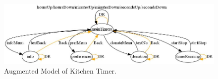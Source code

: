 \begin{figure}[!t]
\centering
\includegraphics[width=\textwidth]{figures/dotGraph.jpg}
\caption{Augmented Model of Kitchen Timer.}
\label{fig:dotGraph}
\end{figure}

